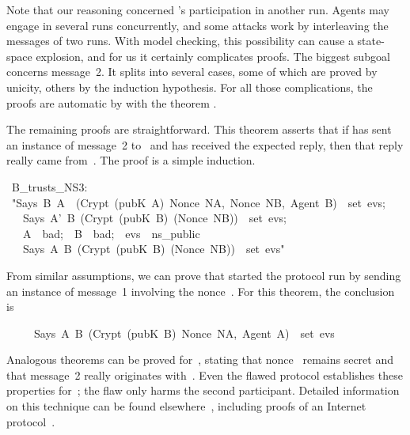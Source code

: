Note that our reasoning concerned 's participation in another
run.  Agents may engage in several runs concurrently, and some attacks work
by interleaving the messages of two runs.  With model checking, this
possibility can cause a state-space explosion, and for us it
certainly complicates proofs.  The biggest subgoal concerns message~2.  It
splits into several cases, some of which are proved by unicity, others by
the induction hypothesis.  For all those complications, the proofs are
automatic by  with the theorem .

The remaining proofs are straightforward.  This theorem asserts that if
 has sent an instance of message~2 to~ and has received the
expected reply, then that reply really came from~.  The proof is a
simple induction.
\begin{isabelle}
\ B_trusts_NS3:\isanewline
\ "\isasymlbrakk Says\ B\ A\ \ (Crypt\ (pubK\ A)\ \isasymlbrace Nonce\ NA,\ Nonce\ NB,\ Agent\ B\isasymrbrace )\ \isasymin \ set\ evs;\isanewline
\ \ \ Says\ A'\ B\ (Crypt\ (pubK\ B)\ (Nonce\ NB))\ \isasymin \ set\ evs;\ \isanewline
\ \ \ A\ \isasymnotin \ bad;\ \ B\ \isasymnotin \ bad;\ \ evs\ \isasymin \ ns_public\isasymrbrakk \ \ \ \ \ \ \ \ \isanewline
\ \ \isasymLongrightarrow \ Says\ A\ B\ (Crypt\ (pubK\ B)\ (Nonce\ NB))\ \isasymin \ set\
evs"
\end{isabelle}

From similar assumptions, we can prove that  started the protocol
run by sending an instance of message~1 involving the nonce~\isa{NA}.  For
this theorem, the conclusion is 
\begin{isabelle}
\ \ \ \ \ Says\ A\ B\ (Crypt\ (pubK\ B)\ \isasymlbrace Nonce\ NA,\ Agent\
A\isasymrbrace )\ \isasymin \ set\ evs
\end{isabelle}
%
Analogous theorems can be proved for~, stating that nonce~
remains secret and that message~2 really originates with~.  Even the
flawed protocol establishes these properties for~\isa{A};
the flaw only harms the second participant.
Detailed information on this technique can be found
elsewhere~\cite{paulson-jcs}, including proofs of an Internet
protocol~\cite{paulson-tls}.


\endinput
